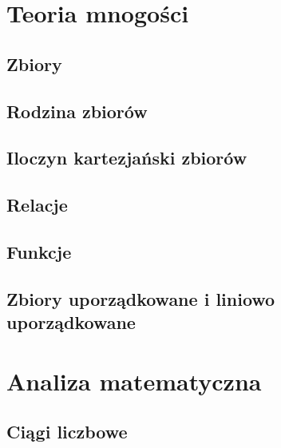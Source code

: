 \documentclass[a4paper,12pt]{report}
\begin{document}
\tableofcontents
\chapter{Teoria mnogości}
\section{Zbiory}

\section{Rodzina zbiorów}

\section{Iloczyn kartezjański zbiorów}

\section{Relacje}

\section{Funkcje}

\section{Zbiory uporządkowane i liniowo uporządkowane}

\chapter{Analiza matematyczna}
\section{Ciągi liczbowe}





\end{document}
